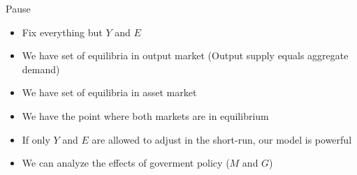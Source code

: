 \documentclass{beamer}
\begin{document}

\begin{frame}{Pause}
    \begin{itemize}
        \item Fix everything but $Y$ and $E$
        \item We have set of equilibria in output market (Output supply equals aggregate demand)
        \item We have set of equilibria in asset market
        \item We have the point where both markets are in equilibrium 
        \item If only $Y$ and $E$ are allowed to adjust in the short-run, our model is powerful
        \item We can analyze the effects of goverment policy ($M$ and $G$)
    \end{itemize}
\end{frame}
\end{document}
